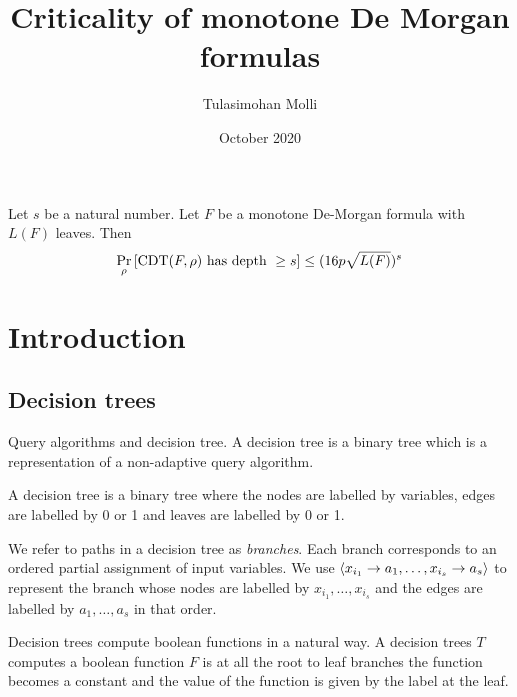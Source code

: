 \documentclass{article}
\title{Criticality of monotone De Morgan formulas}
\author{Tulasimohan Molli}
\date{October 2020}
\newcommand{\cdt}{\mathrm{CDT}}
\newcommand{\depth}{depth}
\begin{document}
\maketitle    
    \begin{theorem}
    \label{thm:main theorem}
    Let $s$ be a natural number. Let $F$ be a monotone De-Morgan formula with $L(F)$ leaves. Then 
    \[
        \prob{\rho}{\cdt(F,\rho) \text{ has \depth\ } \geq s} \leq (16p\sqrt{L(F)})^s
    \]
\end{theorem}

\section{Introduction}
\subsection{Decision trees}
    Query algorithms and decision tree. 
    A decision tree is a binary tree which is a representation of a non-adaptive query algorithm. 

\begin{definition}
    A decision tree is a binary tree where the nodes are labelled by variables, edges are labelled by 0 or 1 and leaves are labelled by 0 or 1.    
\end{definition}
    We refer to paths in a decision tree as \emph{branches}.
    Each branch corresponds to an ordered partial assignment of input variables.
    We use $\left\langle x_{i_1} \to a_1, \ldots , x_{i_s} \to a_s\right\rangle$ to represent the branch whose nodes are labelled by $x_{i_1}, \ldots ,x_{i_s}$ and the edges are labelled by $a_1, \ldots , a_s$ in that order.     

    Decision trees compute boolean functions in a natural way. 
    A decision trees $T$ computes a boolean function $F$ is at all the root to leaf branches the function becomes a constant and the value of the function is given by the label at the leaf.  
    
       
\end{document}
